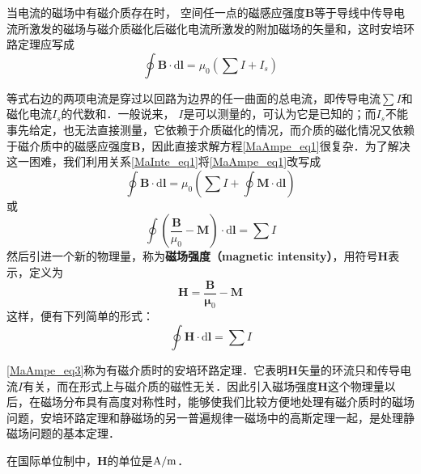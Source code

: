 

当电流的磁场中有磁介质存在时， 空间任一点的磁感应强度$\mathbf B $等于导线中传导电流所激发的磁场与磁介质磁化后磁化电流所激发的附加磁场的矢量和，这时安培环路定理应写成
\begin{equation} \label{MaAmpe_eq1}
\oint \mathbf{B} \cdot \mathrm{d} \mathbf{l}=\mu_{0}\left(\sum I+I_{s}\right)
\end{equation}

等式右边的两项电流是穿过以回路为边界的任一曲面的总电流，即传导电流$\sum I$和磁化电流$I_s$的代数和．一般说来， $I $是可以测量的，可认为它是已知的；而$I_s$不能事先给定，也无法直接测量，它依赖于介质磁化的情况，而介质的磁化情况又依赖于磁介质中的磁感应强度$\mathbf B$，因此直接求解方程\autoref{MaAmpe_eq1}很复杂．为了解决这一困难，我们利用关系\autoref{MaInte_eq1}将\autoref{MaAmpe_eq1}改写成
\begin{equation}
\oint \mathbf{B} \cdot \mathrm{d} \mathbf{l}=\mu_{0}\left(\sum I+\oint \mathbf{M} \cdot \mathrm{d} \mathbf{l}\right)
\end{equation}
或
\begin{equation} 
\oint\left(\frac{\mathbf{B}}{\mu_{0}}-\mathbf{M}\right) \cdot \mathrm{d} \mathbf{l}=\sum I
\end{equation}
然后引进一个新的物理量，称为\textbf{磁场强度（magnetic intensity）}，用符号$\mathbf H$表示，定义为
\begin{equation} \label{MaAmpe_eq2}
\mathbf{H}=\frac{\mathbf{B}}{\mathbf{\mu}_{0}}-\mathbf{M}
\end{equation}
这样，便有下列简单的形式： 
\begin{equation} \label{MaAmpe_eq3}
\oint \mathbf{H} \cdot \mathrm{d} \mathbf{l}=\sum I
\end{equation}

\autoref{MaAmpe_eq3}称为有磁介质时的安培环路定理．它表明$\mathbf H $矢量的环流只和传导电流$I $有关，而在形式上与磁介质的磁性无关．因此引入磁场强度$\mathbf H $这个物理量以后，在磁场分布具有高度对称性时，能够使我们比较方便地处理有磁介质时的磁场问题，安培环路定理和静磁场的另一普遍规律一磁场中的高斯定理一起，是处理静磁场问题的基本定理．

在国际单位制中，$\mathbf  H $的单位是$\rm A/m$．

